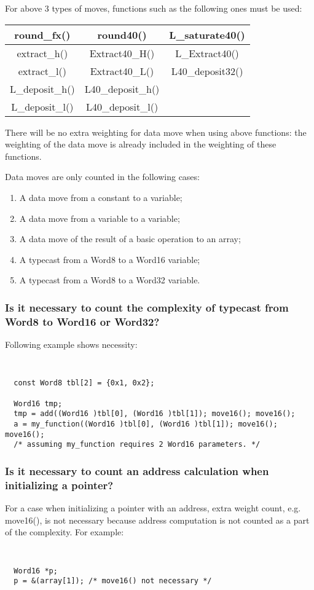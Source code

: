 For above 3 types of moves, functions such as the following ones
must be used:
\begin{center}
\begin{tabular}{|c|c|c|}
\hline
\hline round\_fx() & round40()   & L\_saturate40()\\
\hline extract\_h() & Extract40\_H()   & L\_Extract40()\\
\hline extract\_l() & Extract40\_L()   & L40\_deposit32()\\
\hline L\_deposit\_h()   & L40\_deposit\_h() & \\
\hline L\_deposit\_l()   & L40\_deposit\_l() & \\
\hline
\end{tabular}
\end{center}

There will be no extra weighting for data move when using above
functions: the weighting of the data move is already included in
the weighting of these functions.

Data moves are only counted in
the following cases:
\begin{enumerate}
\item A data move from a constant to a variable;
\item A data move from a variable to a variable;
\item A data move of the result of a basic operation to an array;
\item A typecast from a Word8 to a Word16 variable;
\item A typecast from a Word8 to a Word32 variable.
\end{enumerate}

\subsubsection{Is it necessary to count the complexity of typecast
  from Word8 to Word16 or Word32?}
Following example shows necessity:
{\tt\small
\begin{verbatim}
  const Word8 tbl[2] = {0x1, 0x2};

  Word16 tmp;
  tmp = add((Word16 )tbl[0], (Word16 )tbl[1]); move16(); move16();
  a = my_function((Word16 )tbl[0], (Word16 )tbl[1]); move16(); move16();
  /* assuming my_function requires 2 Word16 parameters. */
\end{verbatim}
}

\subsubsection{Is it necessary to count an address calculation when initializing a pointer?}
For a case when initializing a pointer with an address, extra weight
count, e.g. move16(), is not necessary because address computation is
not counted as a part of the complexity. For example:
{\tt\small
\begin{verbatim}
  Word16 *p;
  p = &(array[1]); /* move16() not necessary */
\end{verbatim}
}%

